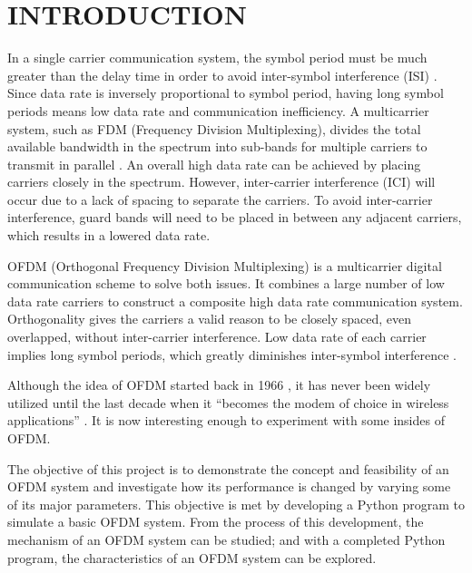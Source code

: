 \section*{INTRODUCTION}

In a single carrier communication system, the symbol period must be much greater than the delay time in order to avoid inter-symbol interference (ISI) \cite{b1}. Since data rate is inversely proportional to symbol period, having long symbol periods means low data rate and communication inefficiency. A multicarrier system, such as FDM (Frequency Division Multiplexing), divides the total available bandwidth in the spectrum into sub-bands for multiple carriers to transmit in parallel \cite{b2}. An overall high data rate can be achieved by placing carriers closely in the spectrum. However, inter-carrier interference (ICI) will occur due to a lack of spacing to separate the carriers. To avoid inter-carrier interference, guard bands will need to be placed in between any adjacent carriers, which results in a lowered data rate.

OFDM (Orthogonal Frequency Division Multiplexing) is a multicarrier digital communication scheme to solve both issues. It combines a large number of low data rate carriers to construct a composite high data rate communication system. Orthogonality gives the carriers a valid reason to be closely spaced, even overlapped, without inter-carrier interference. Low data rate of each carrier implies long symbol periods, which greatly diminishes inter-symbol interference \cite{b3}.

Although the idea of OFDM started back in 1966 \cite{b4}, it has never been widely utilized until the last decade when it “becomes the modem of choice in wireless applications” \cite{b5}. It is now interesting enough to experiment with some insides of OFDM.

The objective of this project is to demonstrate the concept and feasibility of an OFDM system and investigate how its performance is changed by varying some of its major parameters. This objective is met by developing a Python program to simulate a basic OFDM system. From the process of this development, the mechanism of an OFDM system can be studied; and with a completed Python program, the characteristics of an OFDM system can be explored.